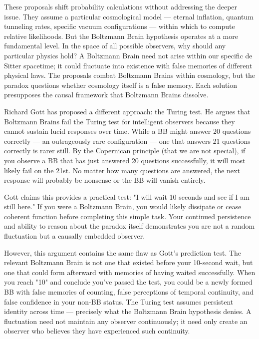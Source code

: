 These proposals shift probability calculations without addressing the deeper issue. They assume a particular cosmological model — eternal inflation, quantum tunneling rates, specific vacuum configurations — within which to compute relative likelihoods. But the Boltzmann Brain hypothesis operates at a more fundamental level. In the space of all possible observers, why should any particular physics hold? A Boltzmann Brain need not arise within our specific de Sitter spacetime; it could fluctuate into existence with false memories of different physical laws. The proposals combat Boltzmann Brains within cosmology, but the paradox questions whether cosmology itself is a false memory. Each solution presupposes the causal framework that Boltzmann Brains dissolve.

Richard Gott has proposed a different approach: the Turing test. He argues that Boltzmann Brains fail the Turing test for intelligent observers because they cannot sustain lucid responses over time. While a BB might answer 20 questions correctly — an outrageously rare configuration — one that answers 21 questions correctly is rarer still. By the Copernican principle (that we are not special), if you observe a BB that has just answered 20 questions successfully, it will most likely fail on the 21st. No matter how many questions are answered, the next response will probably be nonsense or the BB will vanish entirely.

Gott claims this provides a practical test: "I will wait 10 seconds and see if I am still here." If you were a Boltzmann Brain, you would likely dissipate or cease coherent function before completing this simple task. Your continued persistence and ability to reason about the paradox itself demonstrates you are not a random fluctuation but a causally embedded observer.

However, this argument contains the same flaw as Gott's prediction test. The relevant Boltzmann Brain is not one that existed before your 10-second wait, but one that could form afterward with memories of having waited successfully. When you reach "10" and conclude you've passed the test, you could be a newly formed BB with false memories of counting, false perceptions of temporal continuity, and false confidence in your non-BB status. The Turing test assumes persistent identity across time — precisely what the Boltzmann Brain hypothesis denies. A fluctuation need not maintain any observer continuously; it need only create an observer who believes they have experienced such continuity.

